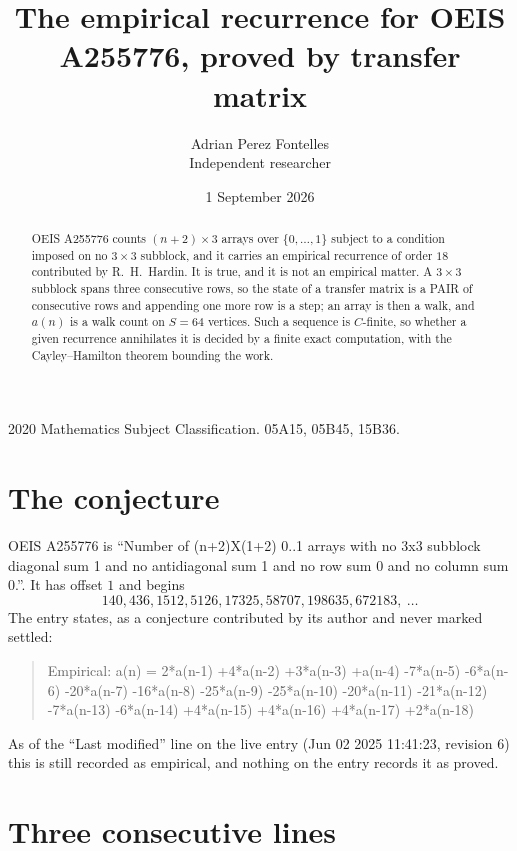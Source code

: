 \documentclass[11pt,a4paper]{article}
\title{The empirical recurrence for OEIS A255776, proved by transfer matrix}
\author{Adrian Perez Fontelles\\ \small Independent researcher}
\date{1 September 2026}
\theoremstyle{plain}
\theoremstyle{definition}
\begin{document}
\maketitle

\begin{abstract}
OEIS A255776 counts $(n+2)\times3$ arrays over $\{0,\dots,1\}$ subject to a condition imposed on
no $3\times3$ subblock, and it carries an empirical recurrence of order $18$
contributed by R.~H.~Hardin. It is true, and it is not an empirical matter. A $3\times3$
subblock spans three consecutive rows, so the state of a transfer matrix is a PAIR of
consecutive rows and appending one more row is a step; an array is then a walk, and
$a(n)$ is a walk count on $S=64$ vertices. Such a sequence is $C$-finite, so whether a given
recurrence annihilates it is decided by a finite exact computation, with the Cayley--Hamilton
theorem bounding the work.
\end{abstract}

\noindent\small 2020 Mathematics Subject Classification. 05A15, 05B45, 15B36.\normalsize

\section{The conjecture}

OEIS A255776 is ``Number of (n+2)X(1+2) 0..1 arrays with no 3x3 subblock diagonal sum 1 and no antidiagonal sum 1 and no row sum 0 and no column sum 0.''. It has offset $1$ and begins
\[
140, 436, 1512, 5126, 17325, 58707, 198635, 672183,\ \dots
\]
The entry states, as a conjecture contributed by its author and never marked settled:
\begin{quote}
Empirical: a(n) = 2*a(n-1) +4*a(n-2) +3*a(n-3) +a(n-4) -7*a(n-5) -6*a(n-6) -20*a(n-7) -16*a(n-8) -25*a(n-9) -25*a(n-10) -20*a(n-11) -21*a(n-12) -7*a(n-13) -6*a(n-14) +4*a(n-15) +4*a(n-16) +4*a(n-17) +2*a(n-18)
\end{quote}
As of the ``Last modified'' line on the live entry (Jun 02 2025 11:41:23, revision 6) this is still
recorded as empirical, and nothing on the entry records it as proved.

\section{Three consecutive lines}
\end{document}

